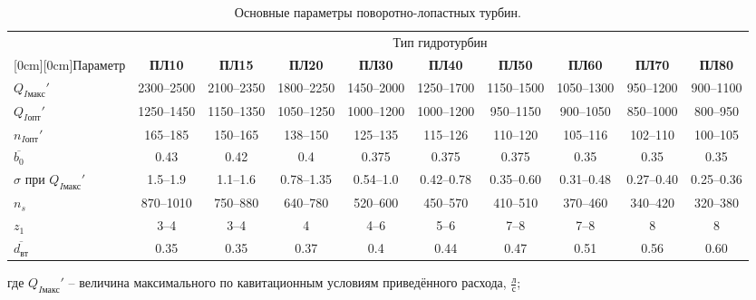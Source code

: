\begin{landscape}


\renewcommand{\arraystretch}{1.4}
\begin{table}[ht]
\caption{Основные параметры поворотно-лопастных турбин.}
\label{tab_6}
\centering

\footnotesize
\begin{tabular}{|l|c|c|c|c|c|c|c|c|c|}



\hline
    & \multicolumn{9}{c|}{Тип гидротурбин} \\
\cline{2-10}


   \raisebox{1.5ex}[0cm][0cm]{Параметр} & \textbf{ПЛ10} & \textbf{ПЛ15} & \textbf{ПЛ20} & \textbf{ПЛ30} & \textbf{ПЛ40} & \textbf{ПЛ50} & \textbf{ПЛ60} & \textbf{ПЛ70} & \textbf{ПЛ80}   \\ 

\hline
  $Q_{I\text{макс}}'$ & 2300--2500 & 2100--2350 & 1800--2250 & 1450--2000 & 1250--1700 & 1150--1500 & 1050--1300 & 950--1200 & 900--1100   \\
\hline
  $Q_{I\text{опт}}'$  & 1250--1450 & 1150--1350 & 1050--1250 & 1000--1200 & 1000--1200 & 950--1150 & 900--1050 & 850--1000 & 800--950    \\
\hline
  $n_{I\text{опт}}'$  & 165--185 & 150--165 & 138--150 & 125--135 & 115--126 & 110--120 & 105--116 & 102--110 & 100--105    \\
\hline
  $\overline{b_0}$  & 0.43 & 0.42 & 0.4 & 0.375 & 0.375 & 0.375 & 0.35 & 0.35 & 0.35    \\
\hline
  $\sigma$ при $Q_{I\text{макс}}'$  & 1.5--1.9 & 1.1--1.6 & 0.78--1.35 & 0.54--1.0 & 0.42--0.78 & 0.35--0.60 & 0.31--0.48 & 0.27--0.40 & 0.25--0.36    \\

\hline
  $n_s$  & 870--1010 & 750--880 & 640--780 & 520--600 & 450--570 & 410--510 & 370--460 & 340--420 & 320--380    \\
\hline
  $z_1$  & 3--4 & 3--4 & 4 & 4--6 & 5--6 & 7--8 & 7--8 & 8 & 8    \\

\hline
  $\overline{d_{\text{вт}}}$  & 0.35 & 0.35 & 0.37 & 0.4 & 0.44 & 0.47 & 0.51 & 0.56 & 0.60    \\



\hline
\end{tabular}
\end{table}

где $Q_{I\text{макс}}'$ -- величина максимального по кавитационным условиям приведённого расхода, $\frac{\text{л}}{\text{с}}$; 


\end{landscape}
